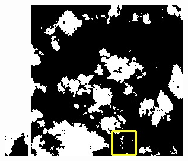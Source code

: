 \documentclass[10pt]{ctexart}
\begin{document}
\begin{figure}[H]
{{\begin{minipage}[b]{0.15\linewidth}
            \includegraphics[width=1\linewidth]{../log/spoon2/cut/tmp_cut_LC80350192014190LGN00_06561_my.jpg}\vspace{4pt}
            \includegraphics[width=1\linewidth]{../log/spoon2/cut/LC80980712014024LGN00_15443_my.jpg}\vspace{4pt}

\end{minipage}}}
\end{figure}
\end{document}
